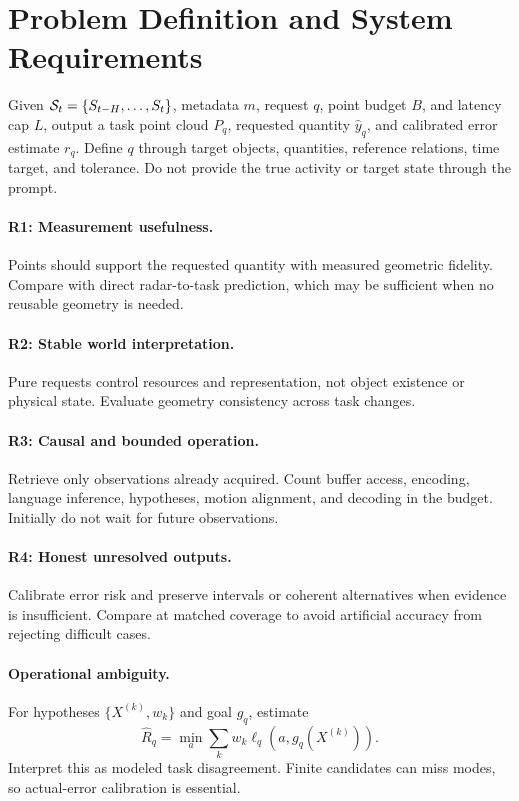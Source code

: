 \section{Problem Definition and System Requirements}
\label{sec:problem}
Given $\mathcal{S}_t=\{S_{t-H},\ldots,S_t\}$, metadata $m$, request $q$, point budget $B$, and latency cap $L$, output a task point cloud $P_q$, requested quantity $\widehat y_q$, and calibrated error estimate $r_q$. Define $q$ through target objects, quantities, reference relations, time target, and tolerance. Do not provide the true activity or target state through the prompt.

\paragraph{R1: Measurement usefulness.}
Points should support the requested quantity with measured geometric fidelity. Compare with direct radar-to-task prediction, which may be sufficient when no reusable geometry is needed.

\paragraph{R2: Stable world interpretation.}
Pure requests control resources and representation, not object existence or physical state. Evaluate geometry consistency across task changes.

\paragraph{R3: Causal and bounded operation.}
Retrieve only observations already acquired. Count buffer access, encoding, language inference, hypotheses, motion alignment, and decoding in the budget. Initially do not wait for future observations.

\paragraph{R4: Honest unresolved outputs.}
Calibrate error risk and preserve intervals or coherent alternatives when evidence is insufficient. Compare at matched coverage to avoid artificial accuracy from rejecting difficult cases.

\paragraph{Operational ambiguity.}
For hypotheses $\{X^{(k)},w_k\}$ and goal $g_q$, estimate
\begin{equation}
\widehat R_q=\min_a\sum_k w_k\ell_q(a,g_q(X^{(k)})).
\end{equation}
Interpret this as modeled task disagreement. Finite candidates can miss modes, so actual-error calibration is essential.
